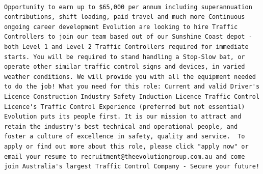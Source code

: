 \documentclass[11pt,a4paper,]{article}
\begin{document}
\begin{verbatim}
                                                                                                                                                                                                                                                               Opportunity to earn up to $65,000 per annum including superannuation contributions, shift loading, paid travel and much more Continuous ongoing career development Evolution are looking to hire Traffic Controllers to join our team based out of our Sunshine Coast depot - both Level 1 and Level 2 Traffic Controllers required for immediate starts. You will be required to stand handling a Stop-Slow bat, or operate other similar traffic control signs and devices, in varied weather conditions. We will provide you with all the equipment needed to do the job! What you need for this role: Current and valid Driver's Licence Construction Industry Safety Induction Licence Traffic Control Licence's Traffic Control Experience (preferred but not essential) Evolution puts its people first. It is our mission to attract and retain the industry's best technical and operational people, and foster a culture of excellence in safety, quality and service.  To apply or find out more about this role, please click "apply now" or email your resume to recruitment@theevolutiongroup.com.au and come join Australia's largest Traffic Control Company - Secure your future!

\end{verbatim}
\end{document}
